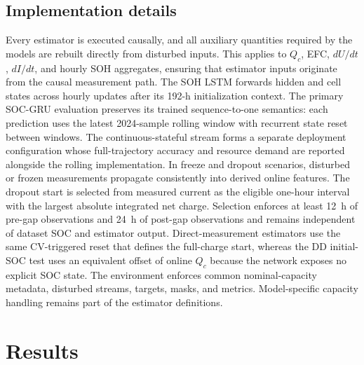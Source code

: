 \documentclass[review,nopreprintline]{elsarticle}
\begin{document}
\subsection{Implementation details}
Every estimator is executed causally, and all auxiliary quantities required by the models are rebuilt directly from disturbed inputs. This applies to $Q_c$, EFC, $dU/dt$, $dI/dt$, and hourly SOH aggregates, ensuring that estimator inputs originate from the causal measurement path. The SOH LSTM forwards hidden and cell states across hourly updates after its 192-h initialization context. The primary SOC-GRU evaluation preserves its trained sequence-to-one semantics: each prediction uses the latest 2024-sample rolling window with recurrent state reset between windows. The continuous-stateful stream forms a separate deployment configuration whose full-trajectory accuracy and resource demand are reported alongside the rolling implementation. In freeze and dropout scenarios, disturbed or frozen measurements propagate consistently into derived online features. The dropout start is selected from measured current as the eligible one-hour interval with the largest absolute integrated net charge. Selection enforces at least 12~h of pre-gap observations and 24~h of post-gap observations and remains independent of dataset SOC and estimator output. Direct-measurement estimators use the same CV-triggered reset that defines the full-charge start, whereas the DD initial-SOC test uses an equivalent offset of online $Q_c$ because the network exposes no explicit SOC state. The environment enforces common nominal-capacity metadata, disturbed streams, targets, masks, and metrics. Model-specific capacity handling remains part of the estimator definitions.

\section{Results}
\end{document}
